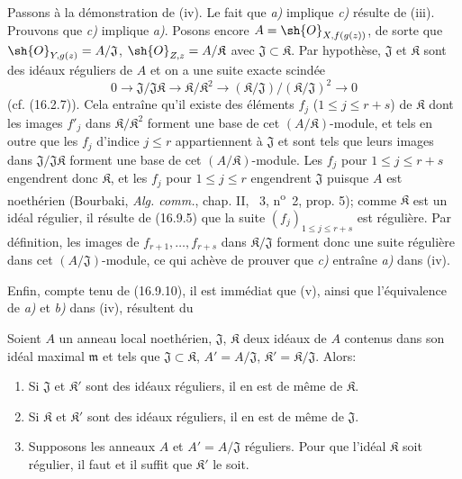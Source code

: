 Passons à la démonstration de (iv). Le fait que \emph{a)} implique \emph{c)} résulte de (iii). Prouvons que \emph{c)} implique \emph{a)}. Posons encore $A=\sh{O}_{X,f(g(z))}$, de sorte que $\sh{O}_{Y,g(z)}=A/\mathfrak J$,
$\sh{O}_{Z,z}=A/\mathfrak K$ avec $\mathfrak J\subset\mathfrak K$. Par hypothèse, $\mathfrak J$ et $\mathfrak K$ sont des idéaux réguliers de $A$ et on a une suite exacte scindée
\[
  0\longrightarrow\mathfrak J/\mathfrak J\mathfrak K\longrightarrow\mathfrak K/\mathfrak K^2\longrightarrow(\mathfrak K/\mathfrak J)/(\mathfrak K/\mathfrak J)^2\longrightarrow0
\]
(cf. (16.2.7)). Cela entraîne qu'il existe des éléments $f_j$ ($1\leq j\leq r+s$) de $\mathfrak K$ dont les images $f'_j$ dans $\mathfrak K/\mathfrak K^2$ forment une base de cet $(A/\mathfrak K)$-module, et tels en outre que les $f_j$ d'indice $j\leq r$ appartiennent à $\mathfrak J$ et sont tels que leurs images dans $\mathfrak J/\mathfrak J\mathfrak K$ forment une base de cet $(A/\mathfrak K)$-module. Les $f_j$ pour $1\leq j\leq r+s$ engendrent donc $\mathfrak K$, et les $f_j$ pour $1\leq j\leq r$ engendrent $\mathfrak J$ puisque $A$ est noethérien (Bourbaki, \emph{Alg. comm.}, chap. II, \textsection~3, n\textsuperscript{o}~2, prop. 5); comme $\mathfrak K$ est un idéal régulier, il résulte de (16.9.5) que la suite $(f_j)_{1\leq j\leq r+s}$ est régulière. Par définition, les images de $f_{r+1},\ldots,f_{r+s}$ dans $\mathfrak K/\mathfrak J$ forment donc une suite régulière dans cet $(A/\mathfrak J)$-module, ce qui achève de prouver que \emph{c)} entraîne \emph{a)} dans (iv).

Enfin, compte tenu de (16.9.10), il est immédiat que (v), ainsi que l'équivalence de \emph{a)} et \emph{b)} dans (iv), résultent du

\begin{corollary}[19.1.6]
\label{IV.19.1.6}
Soient $A$ un anneau local noethérien, $\mathfrak J$, $\mathfrak K$ deux idéaux de $A$ contenus dans son idéal maximal $\mathfrak m$ et tels que $\mathfrak J\subset\mathfrak K$, $A'=A/\mathfrak J$, $\mathfrak K'=\mathfrak K/\mathfrak J$. Alors:
\begin{enumerate}
  \item[\textup{(i)}] Si $\mathfrak J$ et $\mathfrak K'$ sont des idéaux réguliers, il en est de même de $\mathfrak K$.
  \item[\textup{(ii)}] Si $\mathfrak K$ et $\mathfrak K'$ sont des idéaux réguliers, il en est de même de $\mathfrak J$.
  \item[\textup{(iii)}] Supposons les anneaux $A$ et $A'=A/\mathfrak J$ réguliers. Pour que l'idéal $\mathfrak K$ soit régulier, il faut et il suffit que $\mathfrak K'$ le soit.
\end{enumerate}
\end{corollary}

